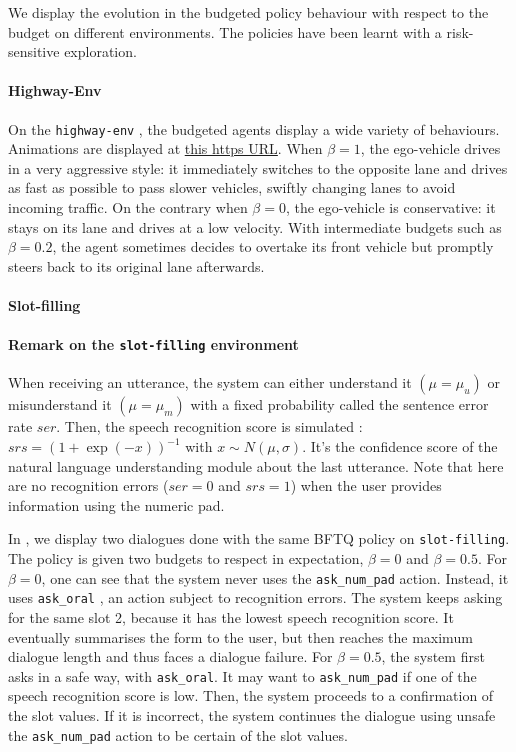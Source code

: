 We display the evolution in the budgeted policy behaviour with respect to the budget on different environments. The policies have been learnt with a risk-sensitive exploration.

\paragraph{Highway-Env}

On the \texttt{highway-env} , the budgeted agents display a wide variety of behaviours. Animations are displayed at  \href{https://budgeted-rl.github.io/\#driving-styles}{this https URL}. When $\beta = 1$, the ego-vehicle drives in a very aggressive style: it immediately switches to the opposite lane and drives as fast as possible to pass slower vehicles, swiftly changing lanes to avoid incoming traffic. On the contrary when $\beta = 0$, the ego-vehicle is conservative: it stays on its lane and drives at a low velocity. With intermediate budgets such as $\beta = 0.2$, the agent sometimes decides to overtake its front vehicle but promptly steers back to its original lane afterwards.

\paragraph{Slot-filling}

\paragraph{Remark on the \texttt{slot-filling} environment} When receiving an utterance, the system can either understand it $(\mu=\mu_u)$ or misunderstand it $(\mu=\mu_m)$ with a fixed probability called the sentence error rate $ser$. Then, the speech recognition score is simulated \citep{Khouzaimi2015}: $srs = (1+\exp(-x))^{-1}$ with $x\sim N(\mu, \sigma)$. It's the confidence score of the natural language understanding module about the last utterance. Note that here are no recognition errors ($ser=0$ and $srs=1$) when the user provides information using the numeric pad.

In , we display two dialogues done with the same BFTQ policy on \texttt{slot-filling}. The policy is given two budgets to respect in expectation, $\beta=0$ and $\beta=0.5$. For $\beta=0$, one can see that the system never uses the \texttt{ask\_num\_pad} action. Instead, it uses \texttt{ask\_oral} , an action subject to recognition errors. The system keeps asking for the same slot 2, because it has the lowest speech recognition score. It eventually summarises the form to the user, but then reaches the maximum dialogue length and thus faces a dialogue failure. For $\beta=0.5$, the system first asks in a safe way, with \texttt{ask\_oral}. It may want to \texttt{ask\_num\_pad} if one of the speech recognition score is low. Then, the system proceeds to a confirmation of the slot values. If it is incorrect, the system continues the dialogue using unsafe the \texttt{ask\_num\_pad} action to be certain of the slot values.

